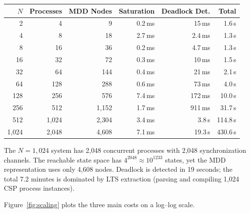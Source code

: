 \documentclass[11pt]{article}
\begin{document}
\begin{center}
\begin{tabular}{rrrrrr}
\toprule
\textbf{$N$} & \textbf{Processes} & \textbf{MDD Nodes} & \textbf{Saturation} & \textbf{Deadlock Det.} & \textbf{Total} \\
\midrule
2    & 4     & 9     & 0.2\,ms  & 15\,ms   & 1.6\,s \\
4    & 8     & 18    & 2.7\,ms  & 2.4\,ms  & 1.3\,s \\
8    & 16    & 36    & 0.2\,ms  & 4.7\,ms  & 1.3\,s \\
16   & 32    & 72    & 0.3\,ms  & 10\,ms   & 1.5\,s \\
32   & 64    & 144   & 0.4\,ms  & 21\,ms   & 2.1\,s \\
64   & 128   & 288   & 0.6\,ms  & 73\,ms   & 4.0\,s \\
128  & 256   & 576   & 7.4\,ms  & 172\,ms  & 10.0\,s \\
256  & 512   & 1{,}152  & 1.7\,ms  & 911\,ms  & 31.7\,s \\
512  & 1{,}024  & 2{,}304  & 3.4\,ms  & 3.8\,s   & 114.8\,s \\
1{,}024 & 2{,}048  & 4{,}608  & 7.1\,ms  & 19.3\,s  & 430.6\,s \\
\bottomrule
\end{tabular}
\end{center}

The $N = 1{,}024$ system has 2{,}048 concurrent processes with 2{,}048
synchronization channels.  The reachable state space has
$4^{2048} \approx 10^{1233}$ states, yet the MDD representation uses
only 4{,}608 nodes.  Deadlock is detected in 19 seconds; the total
7.2 minutes is dominated by LTS extraction (parsing and compiling
1{,}024 CSP process instances).

Figure~\ref{fig:scaling} plots the three main costs on a log--log scale.
\end{document}
